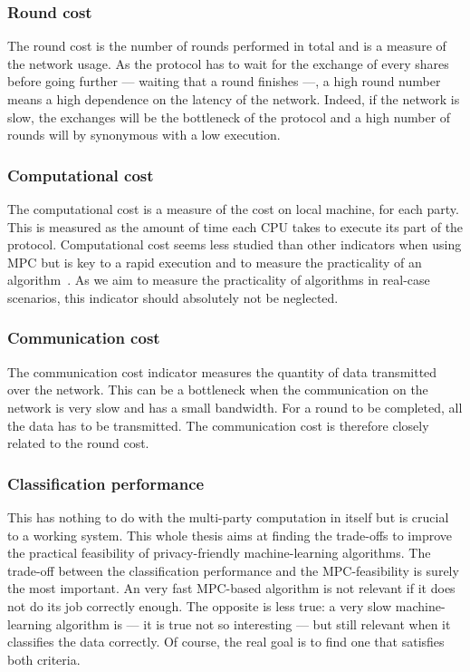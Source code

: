 \subsubsection{Round cost}
The round cost is the number of rounds performed in total and is a measure of the network usage. As the protocol has to wait for the exchange of every shares before going further --- waiting that a round finishes ---, a high round number means a high dependence on the latency of the network. Indeed, if the network is slow, the exchanges will be the bottleneck of the protocol and a high number of rounds will by synonymous with a low execution.

\subsubsection{Computational cost}
The computational cost is a measure of the cost on local machine, for each party. This is measured as the amount of time each CPU takes to execute its part of the protocol. Computational cost seems less studied than other indicators when using MPC but is key to a rapid execution and to measure the practicality of an algorithm~\cite{Blom2014AThesis}. As we aim to measure the practicality of algorithms in real-case scenarios, this indicator should absolutely not be neglected.

\subsubsection{Communication cost}
The communication cost indicator measures the quantity of data transmitted over the network. This can be a bottleneck when the communication on the network is very slow and has a small bandwidth. For a round to be completed, all the data has to be transmitted. The communication cost is therefore closely related to the round cost.

\subsubsection{Classification performance}
This has nothing to do with the multi-party computation in itself but is crucial to a working system. This whole thesis aims at finding the trade-offs to improve the practical feasibility of privacy-friendly machine-learning algorithms. The trade-off between the classification performance and the MPC-feasibility is surely the most important. An very fast MPC-based algorithm is not relevant if it does not do its job correctly enough. The opposite is less true: a very slow machine-learning algorithm is --- it is true not so interesting --- but still relevant when it classifies the data correctly. Of course, the real goal is to find one that satisfies both criteria.